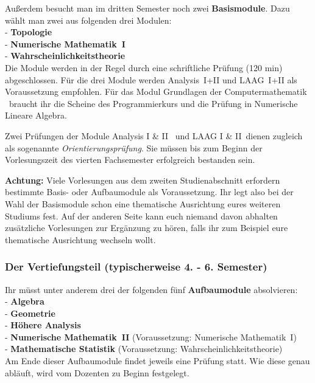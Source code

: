 Außerdem besucht man im dritten Semester noch zwei {\bf Basismodule}.
Dazu wählt man zwei aus folgenden drei Modulen:\\[6pt]
- {\bf Topologie}\\[2pt]
- {\bf Numerische Mathematik~I}\\[2pt]
- {\bf Wahrscheinlichkeitstheorie}\\[6pt]
Die Module werden in der Regel
durch eine schriftliche Prüfung (120 min) abgeschlossen.
Für die drei Module werden Analysis~I+II
und LAAG~I+II als Voraussetzung empfohlen.
Für das Modul \glqq Grundlagen der Computermathematik\grqq
\ braucht ihr die Scheine des Programmierkurs
und die Prüfung in \glqq Numerische Lineare Algebra\grqq.

Zwei Prüfungen der Module \glqq Analysis I \& II\grq
~und \glqq LAAG I \& II\grqq~dienen zugleich
als sogenannte {\it Orientierungsprüfung}.
Sie müssen bis zum Beginn der Vorlesungszeit des vierten Fachsemester
erfolgreich bestanden sein.

{\bf Achtung:}
Viele Vorlesungen aus dem zweiten Studienabschnitt erfordern
bestimmte Basis- oder Aufbaumodule als Voraussetzung.
Ihr legt also bei der Wahl der Basismodule
schon eine thematische Ausrichtung eures weiteren Studiums fest.
Auf der anderen Seite kann euch niemand davon abhalten
zusätzliche Vorlesungen zur Ergänzung zu hören,
falls ihr zum Beispiel eure thematische Ausrichtung wechseln wollt.

\newpage
\subsubsection{Der Vertiefungsteil (typischerweise 4. - 6. Semester)}

Ihr müsst unter anderem
drei der folgenden fünf {\bf Aufbaumodule} absolvieren:\\[6pt]
- {\bf Algebra}\\[2pt]
- {\bf Geometrie}\\[2pt]
- {\bf Höhere Analysis}\\[2pt]
- {\bf Numerische Mathematik~II} (Voraussetzung: Numerische Mathematik~I)\\[2pt]
- {\bf Mathematische Statistik} (Voraussetzung: Wahrscheinlichkeitstheorie)\\[6pt]
Am Ende dieser Aufbaumodule findet jeweils eine Prüfung statt.
Wie diese genau abläuft, wird vom Dozenten zu Beginn festgelegt. 

